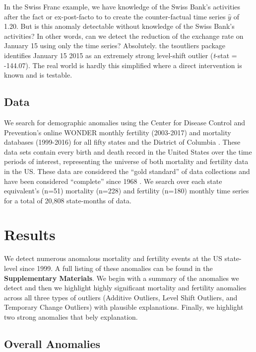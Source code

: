 \documentclass[12pt]{article}
\begin{document}
In the Swiss Franc example, we have knowledge of the Swiss Bank's
activities after the fact or ex-post-facto to to create the
counter-factual time series \(\hat{y}\) of 1.20. But is this anomaly
detectable without knowledge of the Swiss Bank's activities? In other
words, can we detect the reduction of the exchange rate on January 15
using only the time series? Absolutely. the tsoutliers package
identifies January 15 2015 as an extremely strong level-shift outlier
(\emph{t}-stat = -144.07). The real world is hardly this simplified
where a direct intervention is known and is testable.

\hypertarget{data}{%
\subsection{Data}\label{data}}

We search for demographic anomalies using the Center for Disease Control
and Prevention's online WONDER monthly fertility (2003-2017) and
mortality databases (1999-2016) for all fifty states and the District of
Columbia \citep{CDC_fert07, CDC_mort}. These data sets contain every
birth and death record in the United States over the time periods of
interest, representing the universe of both mortality and fertility data
in the US. These data are considered the ``gold standard'' of data
collections \citep{mahapatra2007civil} and have been considered
``complete'' since 1968 \citep{hetzel2016us}. We search over each state
equivalent's (n=51) mortality (n=228) and fertility (n=180) monthly time
series for a total of 20,808 state-months of data.

\hypertarget{results}{%
\section{Results}\label{results}}

We detect numerous anomalous mortality and fertility events at the US
state-level since 1999. A full listing of these anomalies can be found
in the \textbf{Supplementary Materials}. We begin with a summary of the
anomalies we detect and then we highlight highly significant mortality
and fertility anomalies across all three types of outliers (Additive
Outliers, Level Shift Outliers, and Temporary Change Outliers) with
plausible explanations. Finally, we highlight two strong anomalies that
bely explanation.

\hypertarget{overall-anomalies}{%
\subsection{Overall Anomalies}\label{overall-anomalies}}
\end{document}
